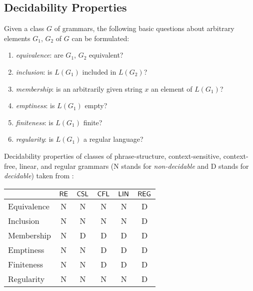 \subsection{Decidability Properties}
\label{subsection:decidability-properties}

Given a class $G$ of grammars, the following basic questions about arbitrary
elements $G_1$, $G_2$ of $G$ can be formulated:

\begin{enumerate}
\item {}\emph{equivalence}: are $G_1$, $G_2$ equivalent?
\item {}\emph{inclusion}: is $L(G_1)$ included in $L(G_2)$?
\item {}\emph{membership}: is an arbitrarily given string $x$ an 
element of $L(G_1)$?
\item {}\emph{emptiness}: is $L(G_1)$ empty?
\item {}\emph{finiteness}: is $L(G_1)$ finite?
\item {}\emph{regularity}: is $L(G_1)$ a regular language?
\end{enumerate}

Decidability properties of classes of phrase-structure, 
context-sensitive, context-free, linear, and regular grammars (N stands for 
\emph{non-decidable} and D stands for \emph{decidable}) taken from \cite{MaSa1997formal}:

\begin{center}
\begin{tabular}{ | l | c | c | c | c | c | }
\hline
              & \index{$\RE$}$\RE$ 
              & \index{$\CSL$}$\CSL$ 
              & \index{$\CFL$}$\CFL$ 
              & \index{$\Lin$}$\Lin$ 
              & \index{$\Reg$}$\Reg$\\
\hline
\index{equivalence}Equivalence
              & N     & N      & N      & N      & D \\
\hline
\index{inclusion}Inclusion
              & N     & N      & N      & N      & D \\
\hline
\index{membership}Membership
              & N     & D      & D      & D      & D \\
\hline
\index{emptiness}Emptiness
              & N     & N      & D      & D      & D \\
\hline
\index{finiteness}Finiteness
              & N     & N      & D      & D      & D \\
\hline
\index{regularity}Regularity
              & N     & N      & N      & N      & D \\
\hline
\end{tabular}
\end{center}

%
